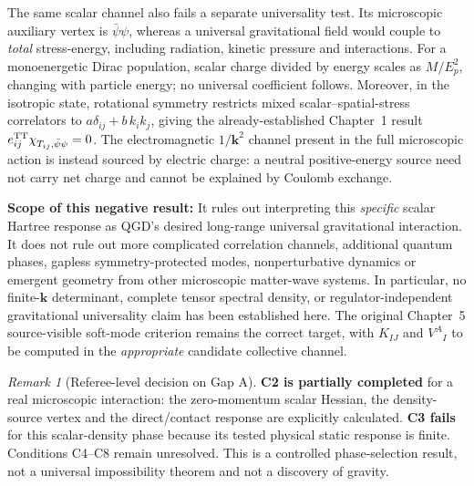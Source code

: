\documentclass[11pt,a4paper]{article}
\theoremstyle{remark}\newtheorem{remark}[theorem]{Remark}
\begin{document}
The same scalar channel also fails a separate universality test. Its microscopic auxiliary vertex is $\bar\psi\psi$, whereas a universal gravitational field would couple to \emph{total} stress-energy, including radiation, kinetic pressure and interactions. For a monoenergetic Dirac population, scalar charge divided by energy scales as $M/E_p^2$, changing with particle energy; no universal coefficient follows. Moreover, in the isotropic state, rotational symmetry restricts mixed scalar--spatial-stress correlators to $a\delta_{ij}+b\,k_ik_j$, giving the already-established Chapter~1 result $e^{\rm TT}_{ij}\chi_{T_{ij},\bar\psi\psi}=0$. The electromagnetic $1/\bm k^2$ channel present in the full microscopic action is instead sourced by electric charge: a neutral positive-energy source need not carry net charge and cannot be explained by Coulomb exchange.

\textbf{Scope of this negative result:} It rules out interpreting this \emph{specific} scalar Hartree response as QGD's desired long-range universal gravitational interaction. It does not rule out more complicated correlation channels, additional quantum phases, gapless symmetry-protected modes, nonperturbative dynamics or emergent geometry from other microscopic matter-wave systems. In particular, no finite-$\bm k$ determinant, complete tensor spectral density, or regulator-independent gravitational universality claim has been established here. The original Chapter~5 source-visible soft-mode criterion remains the correct target, with $K_{IJ}$ and $V^A{}_I$ to be computed in the \emph{appropriate} candidate collective channel.

\begin{remark}[Referee-level decision on Gap A]
\textbf{C2 is partially completed} for a real microscopic interaction: the zero-momentum scalar Hessian, the density-source vertex and the direct/contact response are explicitly calculated. \textbf{C3 fails} for this scalar-density phase because its tested physical static response is finite. Conditions C4--C8 remain unresolved. This is a controlled phase-selection result, not a universal impossibility theorem and not a discovery of gravity.
\end{remark}
\end{document}
